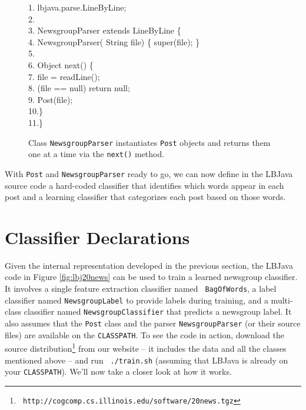 \begin{figure}[t]
\begin{code}
1.  lbjava.parse.LineByLine; \\
2. \>\\
3.  NewsgroupParser
         {\color{ForestGreen} extends} LineByLine \{ \\
4. \>
         NewsgroupParser({\color{BrickRed} String} file)
         \{ {\color{ForestGreen} super}(file); \} \\
5. \>\\
6. \> {\color{BrickRed} Object} next() \{ \\
7. \>\> file = readLine(); \\
8. \>\> (file == {\color{BrickRed} null})
           {\color{YellowOrange} return} {\color{BrickRed} null};
            \\
9. \>\> Post(file); \\
10.\>\>\} \\
11.\>\}
\end{code}
\caption{Class {\tt NewsgroupParser} instantiates {\tt Post} objects and
returns them one at a time via the {\tt next()} method.}
\label{fig:newsParser}
\end{figure}

With {\tt Post} and {\tt NewsgroupParser} ready to go, we can now define in
the LBJava source code a hard-coded classifier that identifies which words appear
in each post and a learning classifier that categorizes each post based on
those words.

\section{Classifier Declarations}

Given the internal representation developed in the previous section, the LBJava
code in Figure \ref{fig:lbj20news} can be used to train a learned newsgroup
classifier.  It involves a single feature extraction classifier named {\tt
BagOfWords}, a label classifier named {\tt NewsgroupLabel} to provide labels
during training, and a multi-class classifier named {\tt NewsgroupClassifier}
that predicts a newsgroup label.  It also assumes that the {\tt Post} class
and the parser {\tt NewsgroupParser} (or their source files) are available on
the {\tt CLASSPATH}.  To see the code in action, download the source
distribution\footnote{{\tt
http://cogcomp.cs.illinois.edu/software/20news.tgz}} from our website -- it
includes the data and all the classes mentioned above -- and run {\tt
./train.sh} (assuming that LBJava is already on your {\tt CLASSPATH}).  We'll now
take a closer look at how it works.

